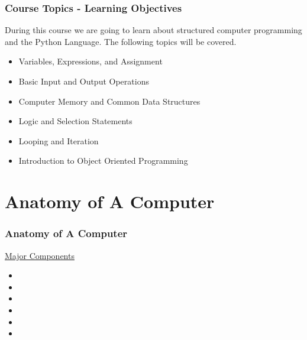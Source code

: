 \documentclass[fleqn]{beamer} %
\newcommand{\sectiontitleII}{Course Topics - Learning Objectives}
\newcommand{\sectiontitleIII}{Anatomy of A Computer}
\begin{document}
	\begin{frame}[label=sectionII,containsverbatim] \small
		\frametitle{\sectiontitleII}
 		During this course we are going to learn about structured computer programming and the Python Language. The following topics will be covered.
		\begin{itemize}
			
			\item Variables, Expressions, and Assignment
			
			\item Basic Input and Output Operations
			
			\item Computer Memory and Common Data Structures
			
			\item Logic and Selection Statements 
			
			\item Looping and Iteration 
			
			\item Introduction to Object Oriented Programming  
			
		\end{itemize}


	\end{frame}

\section{\sectiontitleIII}

	\begin{frame} \small
		\frametitle{\sectiontitleIII}
		
		\underline{\large Major Components}
		\begin{itemize}
			
			\item
			\item 
			\item 
			\item  
			\item
			\item	
			
		\end{itemize}
	\end{frame}
\end{document}
